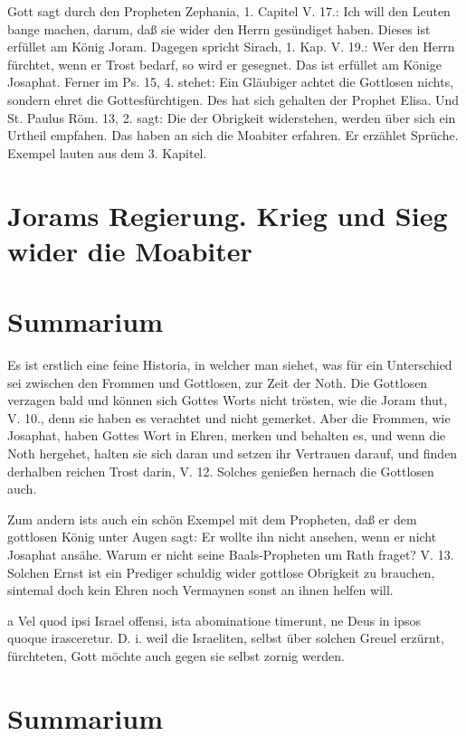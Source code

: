 Gott sagt durch den Propheten Zephania, 1. Capitel V. 17.: Ich will den Leuten bange machen, darum, daß sie wider den Herrn gesündiget haben. Dieses ist erfüllet am König Joram. Dagegen spricht Sirach, 1. Kap. V. 19.: Wer den Herrn fürchtet, wenn er Trost bedarf, so wird er gesegnet. Das ist erfüllet am Könige Josaphat. Ferner im Ps. 15, 4. stehet: Ein Gläubiger achtet die Gottlosen nichts, sondern ehret die Gottesfürchtigen. Des hat sich gehalten der Prophet Elisa. Und St. Paulus Röm. 13, 2. sagt: Die der Obrigkeit widerstehen, werden über sich ein Urtheil empfahen. Das haben an sich die Moabiter erfahren. Er erzählet Sprüche. Exempel lauten aus dem 3. Kapitel.

\section{Jorams Regierung. Krieg und Sieg wider die Moabiter}

\section{Summarium}

Es ist erstlich eine feine Historia, in welcher man siehet, was für ein Unterschied sei zwischen den Frommen und Gottlosen, zur Zeit der Noth. Die Gottlosen verzagen bald und können sich Gottes Worts nicht trösten, wie die Joram thut, V. 10., denn sie haben es verachtet und nicht gemerket. Aber die Frommen, wie Josaphat, haben Gottes Wort in Ehren, merken und behalten es, und wenn die Noth hergehet, halten sie sich daran und setzen ihr Vertrauen darauf, und finden derhalben reichen Trost darin, V. 12. Solches genießen hernach die Gottlosen auch.

Zum andern ists auch ein schön Exempel mit dem Propheten, daß er dem gottlosen König unter Augen sagt: Er wollte ihn nicht ansehen, wenn er nicht Josaphat ansähe. Warum er nicht seine Baals-Propheten um Rath fraget? V. 13. Solchen Ernst ist ein Prediger schuldig wider gottlose Obrigkeit zu brauchen, sintemal doch kein Ehren noch Vermaynen sonst an ihnen helfen will.

a Vel quod ipsi Israel offensi, ista abominatione timerunt, ne Deus in ipsos quoque irasceretur. D. i. weil die Israeliten, selbst über solchen Greuel erzürnt, fürchteten, Gott möchte auch gegen sie selbst zornig werden.

\section{Summarium}

